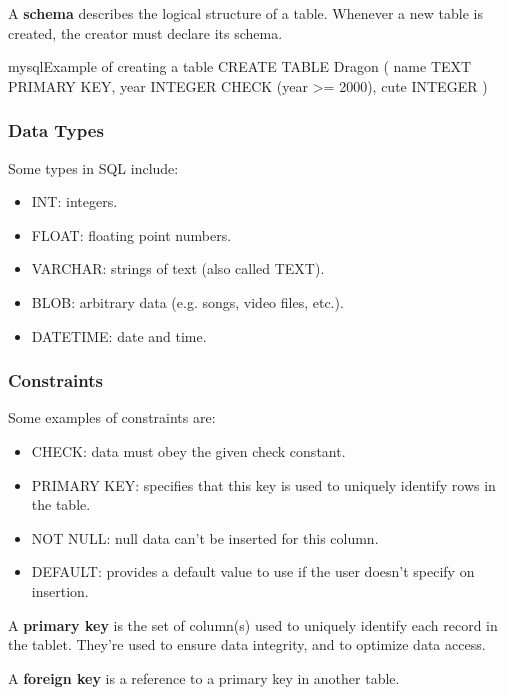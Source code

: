 \documentclass[openany]{book}
\begin{document}
\begin{defn}[Schema]
	A \textbf{schema} describes the logical structure of a table. Whenever a new table is created, the creator must declare its schema.
\end{defn}
\begin{code}{mysql}{Example of creating a table}
CREATE TABLE Dragon (
	name TEXT PRIMARY KEY,
	year INTEGER CHECK (year >= 2000),
	cute INTEGER
)
\end{code}

\subsubsection{Data Types}
Some types in SQL include:
\begin{itemize}
	\item INT: integers.
	\item FLOAT: floating point numbers.
	\item VARCHAR: strings of text (also called TEXT).
	\item BLOB: arbitrary data (e.g. songs, video files, etc.).
	\item DATETIME: date and time.
\end{itemize}

\subsubsection{Constraints}
Some examples of constraints are:
\begin{itemize}
	\item CHECK: data must obey the given check constant.
	\item PRIMARY KEY: specifies that this key is used to uniquely identify rows in the table.
	\item NOT NULL: null data can't be inserted for this column.
	\item DEFAULT: provides a default value to use if the user doesn't specify on insertion.
\end{itemize}

\begin{defn}
	A \textbf{primary key} is the set of column(s) used to uniquely identify each record in the tablet. They're used to ensure data integrity, and to optimize data access.
\end{defn}

\begin{defn}
	A \textbf{foreign key} is a reference to a primary key in another table.
\end{defn}
\end{document}
